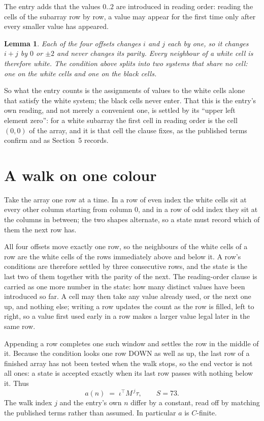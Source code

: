 \documentclass[11pt,a4paper]{article}
\theoremstyle{plain}
\newtheorem{lemma}[theorem]{Lemma}
\theoremstyle{definition}
\begin{document}
The entry adds that the values $0..2$ are introduced in reading order: reading the cells of the subarray row by row, a value may appear for the first time only after every smaller value has appeared.

\begin{lemma}\label{lem:split}
Each of the four offsets changes $i$ and $j$ each by one, so it changes $i+j$ by $0$ or $\pm2$
and never changes its parity. Every neighbour of a white cell is therefore white. The condition
above splits into two systems that share no cell: one on the white cells and one on the black
cells.
\end{lemma}

So what the entry counts is the assignments of values to the white cells alone that satisfy the
white system; the black cells never enter. That this is the entry's own reading, and not
merely a convenient one, is settled by its ``upper left element zero'': for a white subarray the
first cell in reading order is the cell $(0,0)$ of the array, and it is that cell the
clause fixes, as the published terms confirm and as Section~5 records.

\section{A walk on one colour}

Take the array one row at a time. In a row of even index the white cells sit at every other
column starting from column $0$, and in a row of odd index they sit at the columns in
between; the two shapes alternate, so a state must record which of them the next row has.

All four offsets move exactly one row, so the neighbours of the white cells of a row are the
white cells of the rows immediately above and below it. A row's conditions are therefore settled
by three consecutive rows, and the state is the last two of them together with the parity of the
next.
The reading-order clause is carried as one more number in the state: how many distinct values
have been introduced so far. A cell may then take any value already used, or the next one up,
and nothing else; writing a row updates the count as the row is filled, left to right, so a
value first used early in a row makes a larger value legal later in the same row.


Appending a row completes one such window and settles the row in the middle of it. Because the
condition looks one row DOWN as well as up, the last row of a finished array has not been tested
when the walk stops, so the end vector is not all ones: a state is accepted exactly when its
last row passes with nothing below it. Thus
\[
a(n)\;=\;\iota^{\!\top}M^{\,j}\tau ,\qquad S=73.
\]
The walk index $j$ and the entry's own $n$ differ by a constant, read off by matching the
published terms rather than assumed. In particular $a$ is $C$-finite.
\end{document}
